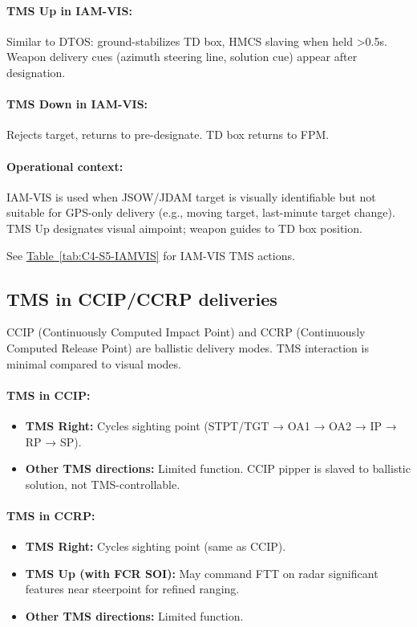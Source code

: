 \documentclass[11pt, a4paper, twoside]{report}
\newcommand{\tabref}[1]{\hyperref[#1]{Table~\ref*{#1}}}
\begin{document}
\paragraph{TMS Up in IAM-VIS:}
Similar to DTOS: ground-stabilizes TD box, HMCS slaving when held >0.5s. Weapon delivery cues (azimuth steering line, solution cue) appear after designation.

\paragraph{TMS Down in IAM-VIS:}
Rejects target, returns to pre-designate. TD box returns to FPM.

\paragraph{Operational context:}
IAM-VIS is used when JSOW/JDAM target is visually identifiable but not suitable for GPS-only delivery (e.g., moving target, last-minute target change). TMS Up designates visual aimpoint; weapon guides to TD box position.

See \tabref{tab:C4-S5-IAMVIS} for IAM-VIS TMS actions.

\subsection{TMS in CCIP/CCRP deliveries}
\label{sec:C3-S5-S4}

CCIP (Continuously Computed Impact Point) and CCRP (Continuously Computed Release Point) are ballistic delivery modes. TMS interaction is minimal compared to visual modes.

\paragraph{TMS in CCIP:}
\begin{itemize}
    \item \textbf{TMS Right:} Cycles sighting point (STPT/TGT → OA1 → OA2 → IP → RP → SP).
    \item \textbf{Other TMS directions:} Limited function. CCIP pipper is slaved to ballistic solution, not TMS-controllable.
\end{itemize}

\paragraph{TMS in CCRP:}
\begin{itemize}
    \item \textbf{TMS Right:} Cycles sighting point (same as CCIP).
    \item \textbf{TMS Up (with FCR SOI):} May command FTT on radar significant features near steerpoint for refined ranging.
    \item \textbf{Other TMS directions:} Limited function.
\end{itemize}
\end{document}
